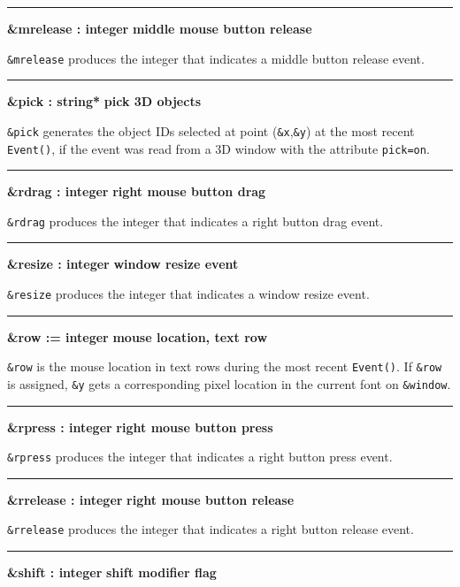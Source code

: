 \bigskip\hrule\vspace{0.1cm}
\noindent
{\bf \&mrelease : integer } \hfill {\bf middle mouse button release}

\noindent
\texttt{\&mrelease} produces the integer that indicates a middle button
release event.

\bigskip\hrule\vspace{0.1cm}
\noindent
{\bf \&pick : string* } \hfill {\bf pick 3D objects}

\noindent
\texttt{\&pick} generates the object IDs selected at point
(\texttt{\&x},\texttt{\&y}) at the most recent \texttt{Event()}, if the
event was read from a 3D window with the attribute \texttt{pick=on}.

\bigskip\hrule\vspace{0.1cm}
\noindent
{\bf \&rdrag : integer } \hfill {\bf right mouse button drag}

\noindent
\texttt{\&rdrag} produces the integer that indicates a right button drag
event.

\bigskip\hrule\vspace{0.1cm}
\noindent
{\bf \&resize : integer } \hfill {\bf window resize event}

\noindent
\texttt{\&resize} produces the integer that indicates a window resize
event.

\bigskip\hrule\vspace{0.1cm}
\noindent
{\bf \&row := integer } \hfill {\bf mouse location, text row}

\noindent
\texttt{\&row} is the mouse location in text rows during the most recent
\texttt{Event()}. If \texttt{\&row} is assigned, \texttt{\&y} gets a
corresponding pixel location in the current font on \texttt{\&window}.

\bigskip\hrule\vspace{0.1cm}
\noindent
{\bf \&rpress : integer } \hfill {\bf right mouse button press}

\noindent
\texttt{\&rpress} produces the integer that indicates a right button
press event.

\bigskip\hrule\vspace{0.1cm}
\noindent
{\bf \&rrelease : integer } \hfill {\bf right mouse button release}

\noindent
\texttt{\&rrelease} produces the integer that indicates a right button
release event.

\bigskip\hrule\vspace{0.1cm}
\noindent
{\bf \&shift : integer } \hfill {\bf shift modifier flag}

